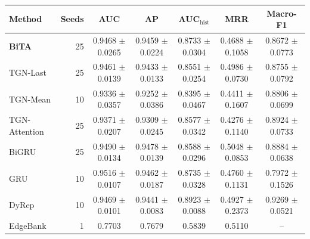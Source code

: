 \begin{tabular}{lrccccc}
\toprule
Method & Seeds & AUC & AP & AUC$_{\mathrm{hist}}$ & MRR & Macro-F1 \\
\midrule
\textbf{BiTA} & 25 & 0.9468 $\pm$ 0.0265 & 0.9459 $\pm$ 0.0224 & 0.8733 $\pm$ 0.0304 & 0.4688 $\pm$ 0.1058 & 0.8672 $\pm$ 0.0773 \\
\midrule
TGN-Last & 25 & 0.9461 $\pm$ 0.0139 & 0.9433 $\pm$ 0.0133 & 0.8551 $\pm$ 0.0254 & 0.4986 $\pm$ 0.0730 & 0.8755 $\pm$ 0.0792 \\
TGN-Mean & 10 & 0.9336 $\pm$ 0.0357 & 0.9252 $\pm$ 0.0386 & 0.8395 $\pm$ 0.0467 & 0.4411 $\pm$ 0.1607 & 0.8806 $\pm$ 0.0699 \\
TGN-Attention & 25 & 0.9371 $\pm$ 0.0207 & 0.9309 $\pm$ 0.0245 & 0.8577 $\pm$ 0.0342 & 0.4276 $\pm$ 0.1140 & 0.8924 $\pm$ 0.0733 \\
BiGRU & 25 & 0.9490 $\pm$ 0.0134 & 0.9478 $\pm$ 0.0139 & 0.8588 $\pm$ 0.0296 & 0.5048 $\pm$ 0.0853 & 0.8884 $\pm$ 0.0638 \\
GRU & 10 & 0.9516 $\pm$ 0.0107 & 0.9462 $\pm$ 0.0187 & 0.8735 $\pm$ 0.0328 & 0.4760 $\pm$ 0.1131 & 0.7972 $\pm$ 0.1526 \\
DyRep & 10 & 0.9469 $\pm$ 0.0101 & 0.9441 $\pm$ 0.0083 & 0.8923 $\pm$ 0.0088 & 0.4927 $\pm$ 0.2373 & 0.9269 $\pm$ 0.0521 \\
EdgeBank & 1 & 0.7703 & 0.7679 & 0.5839 & 0.5110 & -- \\
\bottomrule
\end{tabular}
